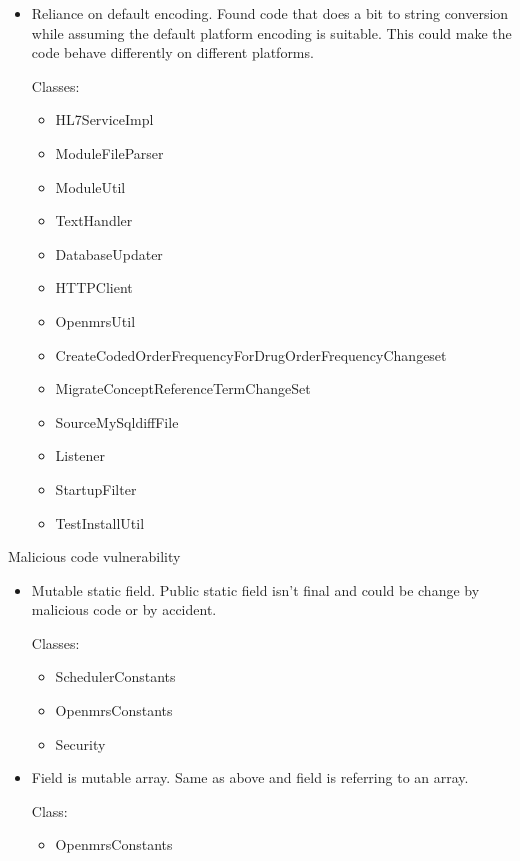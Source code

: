 \documentclass{report} %
\begin{document}
  \begin{itemize}
    \item Reliance on default encoding. 
      Found code that does a bit to string conversion while assuming
      the default platform encoding is suitable. This could make the code
      behave differently on different platforms.

      Classes:

      \begin{itemize}
        \item HL7ServiceImpl
        \item ModuleFileParser
        \item ModuleUtil
        \item TextHandler
        \item DatabaseUpdater
        \item HTTPClient
        \item OpenmrsUtil
        \item CreateCodedOrderFrequencyForDrugOrderFrequencyChangeset
        \item MigrateConceptReferenceTermChangeSet
        \item SourceMySqldiffFile
        \item Listener
        \item StartupFilter
        \item TestInstallUtil
      \end{itemize}
  \end{itemize}
Malicious code vulnerability
  \begin{itemize}
    \item Mutable static field. 
      Public static field isn't final and could be change by malicious
      code or by accident.

      Classes:

      \begin{itemize}
        \item SchedulerConstants
        \item OpenmrsConstants
        \item Security
      \end{itemize}
  \item Field is mutable array. 
    Same as above and field is referring to an array.

    Class:

    \begin{itemize}
      \item OpenmrsConstants
    \end{itemize}
  \end{itemize}
\end{document}
